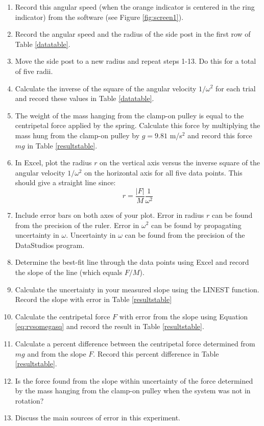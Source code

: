 \begin{enumerate}
	\item Record this angular speed (when the orange indicator is centered in the ring indicator) from the software (see Figure \ref{fig:screen1}).
	\item Record the angular speed and the radius of the side post in the first row of Table \ref{datatable}.
	\item Move the side post to a new radius and repeat steps 1-13. Do this for a total of five radii.
	\item Calculate the inverse of the square of the angular velocity $1/\omega^2$ for each trial and record these values in Table \ref{datatable}.
	\item The weight of the mass hanging from the clamp-on pulley is equal to the centripetal force applied by the spring. Calculate this force by multiplying the mass hung from the clamp-on pulley by $g = 9.81$ m/s$^{2}$ and record this force $mg$ in Table \ref{resultstable}.
	\item In Excel, plot the radius $r$ on the vertical axis versus the inverse square of the angular velocity $1/\omega^2$ on the horizontal axis for all five data points. This should give a straight line since:
	\begin{equation}
		r = \frac{|F|}{M}\frac{1}{\omega^2}
	\label{eq:rvsomegasq}
	\end{equation}
	\item Include error bars on both axes of your plot. Error in radius $r$ can be found from the precision of the ruler. Error in $\omega^2$ can be found by propagating uncertainty in $\omega$. Uncertainty in $\omega$ can be found from the precision of the DataStudios program.
	\item Determine the best-fit line through the data points using Excel and record the slope of the line (which equals $F/M$).
	\item Calculate the uncertainty in your measured slope using the LINEST function. Record the slope with error in Table \ref{resultstable}
	\item Calculate the centripetal force $F$ with error from the slope using Equation \ref{eq:rvsomegasq}
 and record the result in Table \ref{resultstable}.
	\item Calculate a percent difference between the centripetal force determined from $mg$ and from the slope $F$.  Record this percent difference in Table \ref{resultstable}.
	\item Is the force found from the slope within uncertainty of the force determined by the mass hanging from the clamp-on pulley when the system was not in rotation?
	\item Discuss the main sources of error in this experiment.
\end{enumerate}

